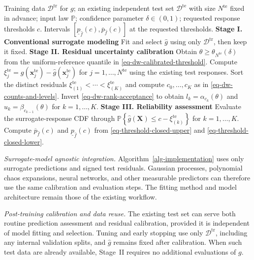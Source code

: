 \documentclass[review,11pt,3p,authoryear,nopreprintline]{elsarticle}
\begin{document}
\begin{algorithm}[H]
  \caption{Residual calibration and reliability assessment within a surrogate workflow}
  \label{alg-implementation}
  \small
  \begin{algorithmic}[1]
    \Require Training data $\mathcal D^{\mathrm{tr}}$ for $g$; an existing independent test set $\mathcal D^{\mathrm{te}}$ with size $N^{\mathrm{te}}$ fixed in advance; input law $\mathbb P$; confidence parameter $\delta\in(0,1)$; requested response thresholds $c$.
    \Ensure Intervals $\left[\underline p_{\hat f}(c),\overline p_{\hat f}(c)\right]$ at the requested thresholds.
    \Statex \textbf{Stage I. Conventional surrogate modeling}
    \State Fit and select $\hat g$ using only $\mathcal D^{\mathrm{tr}}$, then keep it fixed.
    \Statex \textbf{Stage II. Residual uncertainty calibration}
    \State Obtain $\theta\ge\theta_{N^{\mathrm{te}}}(\delta)$ from the uniform-reference quantile in \eqref{eq-dw-calibrated-threshold}.
    \State Compute $\xi_j^{\mathrm{te}}=g(\bm x_j^{\mathrm{te}})-\hat g(\bm x_j^{\mathrm{te}})$ for $j=1,\ldots,N^{\mathrm{te}}$ using the existing test responses.
    \State Sort the distinct residuals $\xi_{(1)}^{\mathrm{te}}<\cdots<\xi_{(K)}^{\mathrm{te}}$ and compute $c_0,\ldots,c_K$ as in \eqref{eq-dw-counts-and-levels}.
    \State Invert \eqref{eq-dw-rank-acceptance} to obtain $l_k=\alpha_{c_k}(\theta)$ and $u_k=\beta_{c_{k-1}}(\theta)$ for $k=1,\ldots,K$.
    \Statex \textbf{Stage III. Reliability assessment}
      \State Evaluate the surrogate-response CDF through $\mathbb P\left\{\hat g(\bm X)\le c-\xi_{(k)}^{\mathrm{te}}\right\}$ for $k=1,\ldots,K$.
      \State Compute $\overline p_{\hat f}(c)$ and $\underline p_{\hat f}(c)$ from \eqref{eq-threshold-closed-upper} and \eqref{eq-threshold-closed-lower}.
    \EndFor
  \end{algorithmic}
\end{algorithm}

\emph{Surrogate-model agnostic integration.}
Algorithm~\ref{alg-implementation} uses only surrogate predictions and signed test residuals. Gaussian processes, polynomial chaos expansions, neural networks, and other measurable predictors can therefore use the same calibration and evaluation steps. The fitting method and model architecture remain those of the existing workflow.

\emph{Post-training calibration and data reuse.}
The existing test set can serve both routine prediction assessment and residual calibration, provided it is independent of model fitting and selection. Tuning and early stopping use only $\mathcal D^{\mathrm{tr}}$, including any internal validation splits, and $\hat g$ remains fixed after calibration. When such test data are already available, Stage~II requires no additional evaluations of $g$.
\end{document}
